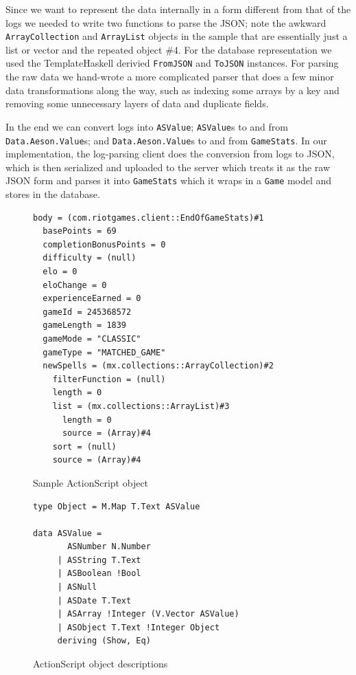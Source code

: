 \documentclass[letterpaper,twocolumn,9pt]{article}
\newcommand{\code}[1]{\texttt{#1}}
\begin{document}
Since we want to represent the data internally in a form different from that of the logs we needed to write two functions to parse the JSON; note the awkward \code{ArrayCollection} and \code{ArrayList} objects in the sample that are essentially just a list or vector and the repeated object \#4.  For the database representation we used the TemplateHaskell derivied \code{FromJSON} and \code{ToJSON} instances.  For parsing the raw data we hand-wrote a more complicated parser that does a few minor data transformations along the way, such as indexing some arrays by a key and removing some unnecessary layers of data and duplicate fields.

In the end we can convert logs into \code{ASValue}; \code{ASValue}s to and from \code{Data.Aeson.Value}s; and \code{Data.Aeson.Value}s to and from \code{GameStats}.  In our implementation, the log-parsing client does the conversion from logs to JSON, which is then serialized and uploaded to the server which treats it as the raw JSON form and parses it into \code{GameStats} which it wraps in a \code{Game} model and stores in the database.

\begin{figure}[btp]
\footnotesize{
\begin{verbatim}
body = (com.riotgames.client::EndOfGameStats)#1
  basePoints = 69
  completionBonusPoints = 0
  difficulty = (null)
  elo = 0
  eloChange = 0
  experienceEarned = 0
  gameId = 245368572
  gameLength = 1839
  gameMode = "CLASSIC"
  gameType = "MATCHED_GAME"
  newSpells = (mx.collections::ArrayCollection)#2
    filterFunction = (null)
    length = 0
    list = (mx.collections::ArrayList)#3
      length = 0
      source = (Array)#4
    sort = (null)
    source = (Array)#4
\end{verbatim}
}
    \caption{Sample ActionScript object}
    \label{samplelog}
\end{figure}

\begin{figure}[h]
\footnotesize{
\begin{verbatim}
type Object = M.Map T.Text ASValue

data ASValue =
       ASNumber N.Number
     | ASString T.Text
     | ASBoolean !Bool
     | ASNull
     | ASDate T.Text
     | ASArray !Integer (V.Vector ASValue)
     | ASObject T.Text !Integer Object
     deriving (Show, Eq)
\end{verbatim}
}
    \caption{ActionScript object descriptions}
    \label{asvalue}
\end{figure}
\end{document}
